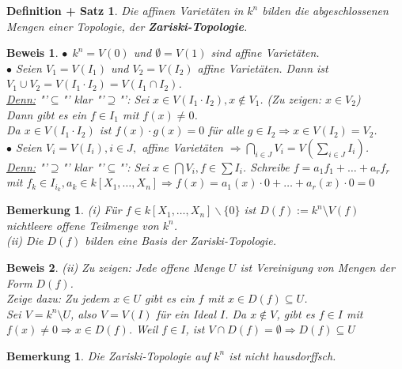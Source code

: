 \documentclass[a4paper,12pt]{report}
\theoremstyle{break}
\newtheorem{DefSatz}[Def]{Definition + Satz}
\newtheorem{Bem}[Def]{Bemerkung}
\theoremstyle{nonumberbreak}
\theoremstyle{nonumberplain}
\newtheorem{Bew}{Beweis}
\newcommand{\emp}[1]{\textbf{\emph{#1}}}
\newcommand{\begriff}[1]{{\index{#1}}\emp{#1}}
\begin{document}
\begin{DefSatz}
\label{defsatz:2.6}
Die affinen Varietäten in $k^n$ bilden die abgeschlossenen Mengen einer Topologie, der \begriff{Zariski-Topologie}.
\end{DefSatz}
\begin{Bew}
$\bullet~~ k^n=V(0)$ und $\emptyset = V(1)$ sind affine Varietäten.\\
$\bullet$ Seien $V_1=V(I_1)$ und $V_2=V(I_2)$ affine Varietäten. Dann ist $V_1\cup V_2=V(I_1\cdot I_2)=V(I_1\cap I_2)$.\\
\underline{Denn:} "'$\subseteq$"' klar "'$\supseteq$"': Sei $x\in V(I_1\cdot I_2), x\notin V_1$. (Zu zeigen: $x\in V_2$)\\
Dann gibt es ein $f\in I_1$ mit $f(x) \neq 0$.\\
Da $x\in V(I_1\cdot I_2)$ ist $f(x)\cdot g(x)=0$ für alle $g\in I_2 \Rightarrow x\in V(I_2) = V_2$.\\
$\bullet$ Seien $V_i = V(I_i), i\in J,$ affine Varietäten $\Rightarrow \bigcap_{i\in J}V_i = V(\sum_{i\in J}I_i)$.\\
\underline{Denn:} "'$\supseteq$"' klar "'$\subseteq$"': Sei $x\in\bigcap V_i, f\in \sum I_i$. Schreibe $f=a_1f_1+\dots+a_rf_r$ mit $f_k\in I_{i_k}, a_k \in k[X_1,\dots,X_n] \Rightarrow f(x)=a_1(x) \cdot 0 +\dots+ a_r(x)\cdot 0 = 0$
\end{Bew}
\begin{Bem}
\label{bem:2.7}
(i) Für $f\in k[X_1,\dots,X_n]\backslash \{0\}$ ist $D(f):= k^n \setminus V(f)$ nichtleere offene Teilmenge von $k^n$.\\
(ii) Die $D(f)$ bilden eine Basis der Zariski-Topologie. 
\end{Bem}
\begin{Bew}
(ii) Zu zeigen: Jede offene Menge $U$ ist Vereinigung von Mengen der Form $D(f)$.\\
Zeige dazu: Zu jedem  $x\in U$ gibt es ein $f$ mit $x\in D(f)\subseteq U$.\\
Sei $V=k^n \setminus U$, also $V=V(I)$ für ein Ideal $I$. Da $x\notin V$, gibt es $f\in I$
mit $f(x)\neq 0 \Rightarrow x\in D(f)$. Weil $f\in I$, ist $V\cap D(f) = \emptyset \Rightarrow D(f) \subseteq U$
\end{Bew}
\begin{Bem}
\label{bem:2.8}
Die Zariski-Topologie auf $k^n$ ist nicht hausdorffsch.
\end{Bem}
\end{document}
